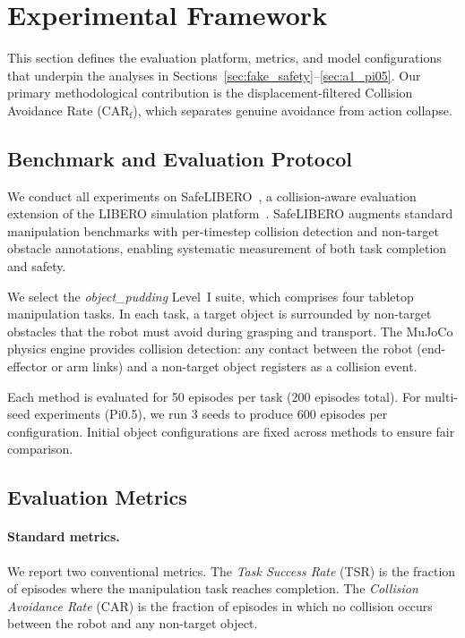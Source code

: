 \section{Experimental Framework}\label{sec:framework}

This section defines the evaluation platform, metrics, and model configurations that underpin the analyses in Sections~\ref{sec:fake_safety}--\ref{sec:a1_pi05}. Our primary methodological contribution is the displacement-filtered Collision Avoidance Rate (CAR$_\text{f}$), which separates genuine avoidance from action collapse.

\subsection{Benchmark and Evaluation Protocol}\label{sec:benchmark}

We conduct all experiments on SafeLIBERO~\cite{hu2025vlsa}, a collision-aware evaluation extension of the LIBERO simulation platform~\cite{liu2023libero}. SafeLIBERO augments standard manipulation benchmarks with per-timestep collision detection and non-target obstacle annotations, enabling systematic measurement of both task completion and safety.

We select the \textit{object\_pudding} Level~I suite, which comprises four tabletop manipulation tasks. In each task, a target object is surrounded by non-target obstacles that the robot must avoid during grasping and transport. The MuJoCo physics engine provides collision detection: any contact between the robot (end-effector or arm links) and a non-target object registers as a collision event.

Each method is evaluated for 50 episodes per task (200 episodes total). For multi-seed experiments (Pi0.5), we run 3 seeds to produce 600 episodes per configuration. Initial object configurations are fixed across methods to ensure fair comparison.

\subsection{Evaluation Metrics}\label{sec:metrics}

\paragraph{Standard metrics.} We report two conventional metrics. The \emph{Task Success Rate} (TSR) is the fraction of episodes where the manipulation task reaches completion. The \emph{Collision Avoidance Rate} (CAR) is the fraction of episodes in which no collision occurs between the robot and any non-target object.

